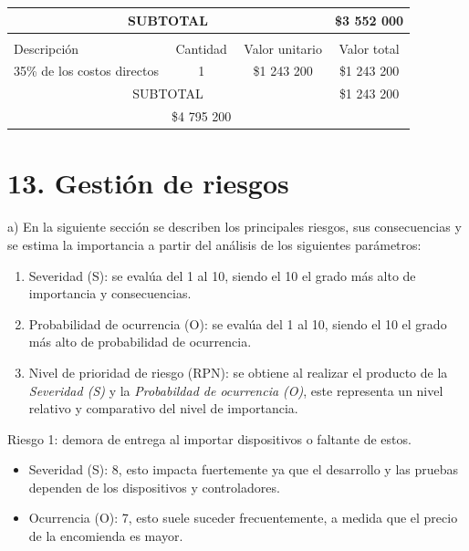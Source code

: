 \documentclass[
11pt, %
]{charter}
\begin{document}
\begin{table}[htpb]
\begin{tabularx}{\linewidth}{@{}|X|c|r|r|@{}}
\multicolumn{3}{|c|}{SUBTOTAL} &
  \multicolumn{1}{c|}{\$3 552 000} \\ \hline
  
\rowcolor[HTML]{C0C0C0} 
\multicolumn{4}{|c|}{\cellcolor[HTML]{C0C0C0}COSTOS INDIRECTOS} \\ \hline
\rowcolor[HTML]{C0C0C0} 
Descripción &
  \multicolumn{1}{c|}{\cellcolor[HTML]{C0C0C0}Cantidad} &
  \multicolumn{1}{c|}{\cellcolor[HTML]{C0C0C0}Valor unitario} &
  \multicolumn{1}{c|}{\cellcolor[HTML]{C0C0C0}Valor total} \\ \hline
  
  \multicolumn{1}{|l|}{35\% de los costos directos}&
  \multicolumn{1}{c|}{1} &
  \multicolumn{1}{c|}{\$1 243 200} &
  \multicolumn{1}{c|}{\$1 243 200} \\ \hline
  
\multicolumn{3}{|c|}{SUBTOTAL} &
  \multicolumn{1}{c|}{\$1 243 200} \\ \hline
\rowcolor[HTML]{C0C0C0}
\multicolumn{3}{|c|}{TOTAL} &
\multicolumn{1}{c|}{\$4 795 200} \\ \hline

\end{tabularx}
\end{table}


\section{13. Gestión de riesgos}
\label{sec:riesgos}


a) En la siguiente sección se describen los principales riesgos, sus consecuencias y se estima la importancia a partir del análisis de los siguientes parámetros:

\begin{enumerate}
\item Severidad (S): se evalúa del 1 al 10, siendo el 10 el grado más alto de importancia y consecuencias.
\item Probabilidad de ocurrencia (O): se evalúa del 1 al 10, siendo el 10 el grado más alto de probabilidad de ocurrencia.
\item Nivel de prioridad de riesgo (RPN): se obtiene al realizar el producto de la \textit{Severidad (S)} y la \textit{Probabildad de ocurrencia (O)}, este representa un nivel relativo y comparativo del nivel de importancia.
\end{enumerate}

Riesgo 1: demora de entrega al importar dispositivos o faltante de estos.
\begin{itemize}
	\item Severidad (S): 8, esto impacta fuertemente ya que el desarrollo y las pruebas dependen de los dispositivos y controladores.
	\item Ocurrencia (O): 7, esto suele suceder frecuentemente, a medida que el precio de la encomienda es mayor.
\end{itemize}
\end{document}

